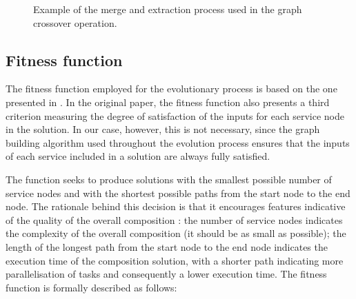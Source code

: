 \documentclass{article}
\begin{document}
\begin{figure}[h]
\centerline{
}
\caption{Example of the merge and extraction process used in the graph crossover operation.}
\label{fig:crossoverExample}
\end{figure}



\subsection{Fitness function}
The fitness function employed for the evolutionary process is based on the one presented in \cite{rodriguez2010composition}. 
In the original paper, the fitness function also presents a third criterion measuring the degree of satisfaction of the inputs
for each service node in the solution. In our case, however, this is not necessary, since the graph building algorithm used throughout
the evolution process ensures that the inputs of each service included in a solution are always fully satisfied.

The function seeks to produce solutions with the smallest possible number of service nodes and with the shortest possible paths from the start node to the
end node. The rationale behind this decision is that it encourages features indicative of the quality of the overall composition \cite{rodriguez2010composition}:
the number of service nodes indicates the complexity of the overall composition (it should be as small as possible); the length of
the longest path from the start node to the end node indicates the execution time of the composition solution, with a shorter
path indicating more parallelisation of tasks and consequently a lower execution time. The fitness function is formally described as follows:
\end{document}
